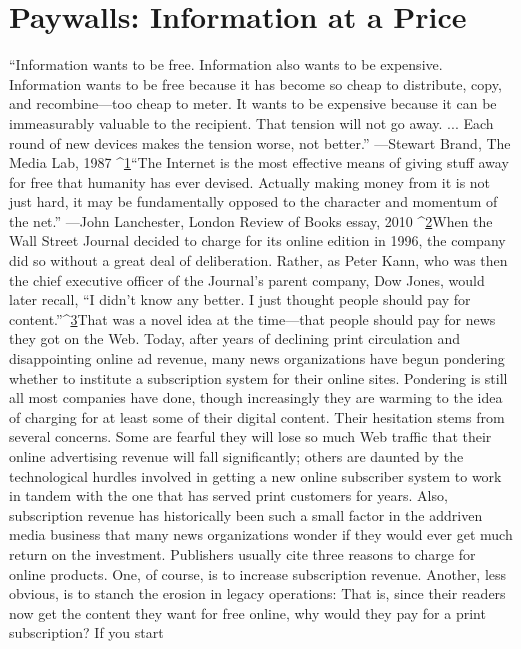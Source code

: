 \chapter{Paywalls: Information at a Price}
``Information wants to be free. Information also wants to be expensive. Information
wants to be free because it has become so cheap to distribute, copy,
and recombine—too cheap to meter. It wants to be expensive because it can be
immeasurably valuable to the recipient. That tension will not go away. ... Each
round of new devices makes the tension worse, not better.''
—Stewart Brand, The Media Lab, 1987 ^{\href{#endnotes-ch5}{1}}``The Internet is the most effective means of giving stuff away for free that
humanity has ever devised. Actually making money from it is not just hard, it
may be fundamentally opposed to the character and momentum of the net.''
—John Lanchester, London Review of Books essay, 2010 ^{\href{#endnotes-ch5}{2}}When the Wall Street Journal decided to charge for its online edition in 1996,
the company did so without a great deal of deliberation. Rather, as Peter Kann,
who was then the chief executive officer of the Journal’s parent company, Dow
Jones, would later recall, ``I didn’t know any better. I just thought people should
pay for content.''^{\href{#endnotes-ch5}{3}}That was a novel idea at the time—that people should pay for news they got
on the Web. Today, after years of declining print circulation and disappointing
online ad revenue, many news organizations have begun pondering whether to
institute a subscription system for their online sites.
Pondering is still all most companies have done, though increasingly they are
warming to the idea of charging for at least some of their digital content. Their
hesitation stems from several concerns. Some are fearful they will lose so much
Web traffic that their online advertising revenue will fall significantly; others are
daunted by the technological hurdles involved in getting a new online subscriber
system to work in tandem with the one that has served print customers for years.
Also, subscription revenue has historically been such a small factor in the addriven
media business that many news organizations wonder if they would ever
get much return on the investment.
Publishers usually cite three reasons to charge for online products. One, of
course, is to increase subscription revenue. Another, less obvious, is to stanch the
erosion in legacy operations: That is, since their readers now get the content they
want for free online, why would they pay for a print subscription? If you start
